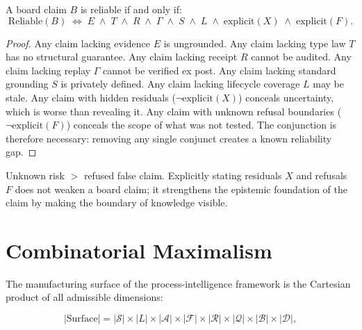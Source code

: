 \begin{theorem}
\label{thm:reliability}
A board claim $B$ is reliable if and only if:
\begin{equation}
\label{eq:reliability}
  \mathrm{Reliable}(B) \;\Longleftrightarrow\;
  E \;\wedge\; T \;\wedge\; R \;\wedge\; \Gamma \;\wedge\; S \;\wedge\; L
  \;\wedge\; \mathrm{explicit}(X) \;\wedge\; \mathrm{explicit}(F).
\end{equation}
\end{theorem}

\begin{proof}
Any claim lacking evidence $E$ is ungrounded. Any claim lacking type law $T$
has no structural guarantee. Any claim lacking receipt $R$ cannot be audited.
Any claim lacking replay $\Gamma$ cannot be verified ex post. Any claim
lacking standard grounding $S$ is privately defined. Any claim lacking
lifecycle coverage $L$ may be stale. Any claim with hidden residuals ($\neg
\mathrm{explicit}(X)$) conceals uncertainty, which is worse than revealing it.
Any claim with unknown refusal boundaries ($\neg \mathrm{explicit}(F)$)
conceals the scope of what was not tested. The conjunction is therefore
necessary: removing any single conjunct creates a known reliability gap.
\end{proof}

\begin{corollary}
\label{cor:residuals}
Unknown risk $>$ refused false claim. Explicitly stating residuals $X$ and
refusals $F$ does not weaken a board claim; it strengthens the epistemic
foundation of the claim by making the boundary of knowledge visible.
\end{corollary}

\section{Combinatorial Maximalism}
\label{sec:pi-combinatorial}

The manufacturing surface of the process-intelligence framework is the
Cartesian product of all admissible dimensions:

\begin{equation}
\label{eq:manufacturing-surface}
  |\mathrm{Surface}| = |\mathcal{S}| \times |L| \times |\mathcal{A}| \times
  |\mathcal{F}| \times |\mathcal{R}| \times |\mathcal{Q}| \times
  |\mathcal{B}| \times |\mathcal{D}|,
\end{equation}


